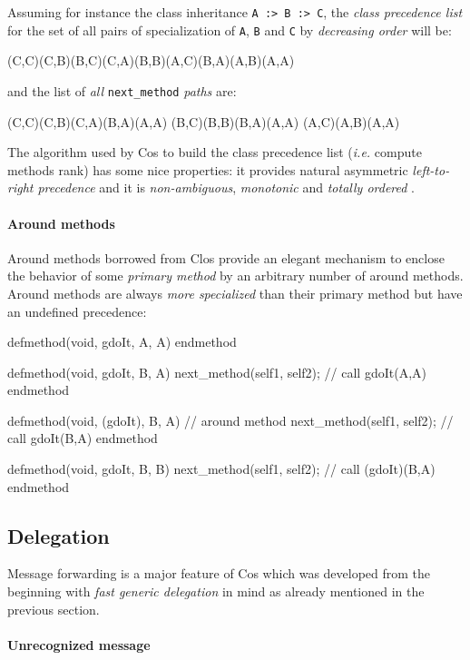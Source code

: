 \documentclass[preprint,10pt]{sigplanconf}
\newcommand{\abbrev}[1]{{\em #1}\xspace}
\newcommand{\ie}{\abbrev{i.e.}}
\newcommand{\ProgLang}[1]{{\sc #1}\xspace}
\newcommand{\Clos}      {\ProgLang{Clos}}
\newcommand{\Cos}       {\ProgLang{Cos}}
\newcommand{\code}[1]{\lstinline[language=COS,style=samplecode]|#1|}
\begin{document}
Assuming for instance the class inheritance \code{A :> B :> C}, the {\em class precedence list} for the set of all pairs of specialization of \code{A}, \code{B} and \code{C} by {\em decreasing order} will be:
\begin{COS}
(C,C)(C,B)(B,C)(C,A)(B,B)(A,C)(B,A)(A,B)(A,A)
\end{COS}
and the list of {\em all} \code{next_method} {\em paths} are:
\begin{COS}
(C,C)(C,B)(C,A)(B,A)(A,A)
(B,C)(B,B)(B,A)(A,A)
(A,C)(A,B)(A,A)
\end{COS}
The algorithm used by \Cos to build the class precedence list (\ie compute methods rank) has some nice properties: it provides natural asymmetric {\em left-to-right precedence} and it is {\em non-ambiguous}, {\em monotonic} and {\em totally ordered} \cite{c3}.

\paragraph{Around methods}

Around methods borrowed from \Clos provide an elegant mechanism to enclose the behavior of some {\em primary method} by an arbitrary number of around methods. Around methods are always {\em more specialized} than their primary method but have an undefined precedence:
\begin{COS}
defmethod(void, gdoIt, A, A)
endmethod

defmethod(void, gdoIt, B, A)
  next_method(self1, self2);  // call gdoIt(A,A)
endmethod

defmethod(void, (gdoIt), B, A) // around method
  next_method(self1, self2); // call gdoIt(B,A)
endmethod

defmethod(void, gdoIt, B, B)
  next_method(self1, self2); // call (gdoIt)(B,A)
endmethod
\end{COS}

\subsection{Delegation\label{ssec:fwd}}

Message forwarding is a major feature of \Cos which was developed from the beginning with {\em fast generic delegation} in mind as already mentioned in the previous section.

\paragraph{Unrecognized message}
\end{document}
